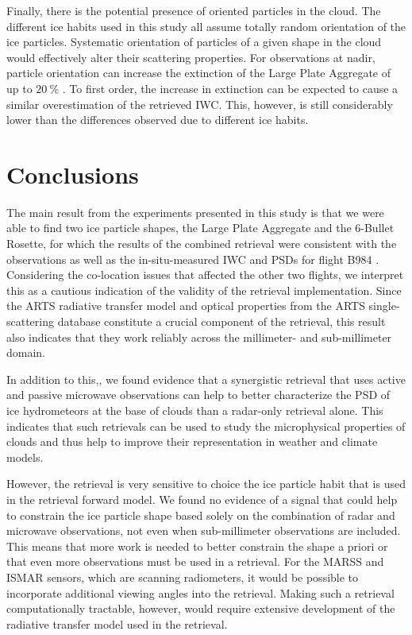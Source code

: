 \documentclass[journal abbreviation, manuscript]{copernicus}
\begin{document}
Finally, there is the potential presence of oriented particles in the cloud. The
different ice habits used in this study all assume totally random orientation of
the ice particles. Systematic orientation of particles of a given shape in the
cloud would effectively alter their scattering properties. For observations at
nadir, particle orientation can increase the extinction of the Large Plate
Aggregate of up to $20\ \unit{\%}$ \citep{barlakas21}. To first order, the
increase in extinction can be expected to cause a similar overestimation of the
retrieved IWC. This, however, is still considerably lower than the differences
observed due to different ice habits.

\section{Conclusions}
\label{sec:conclusions}

The main result from the experiments presented in this study is that we were
able to find two ice particle shapes, the Large Plate Aggregate and the 6-Bullet
Rosette, for which the results of the combined retrieval were consistent with
the observations as well as the in-situ-measured IWC and PSDs for flight B984 .
Considering the co-location issues that affected the other two flights, we
interpret this as a cautious indication of the validity of the retrieval
implementation. Since the ARTS radiative transfer model and optical properties
from the ARTS single-scattering database constitute a crucial component of the
retrieval, this result also indicates that they work reliably across the
millimeter- and sub-millimeter domain.

In addition to this,, we found evidence that a synergistic retrieval that uses
active and passive microwave observations can help to better characterize the
PSD of ice hydrometeors at the base of clouds than a radar-only retrieval alone.
This indicates that such retrievals can be used to study the microphysical
properties of clouds and thus help to improve their representation in weather
and climate models.

However, the retrieval is very sensitive to choice the ice particle habit that
is used in the retrieval forward model. We found no evidence of a signal that
could help to constrain the ice particle shape based solely on the combination
of radar and microwave observations, not even when sub-millimeter observations
are included. This means that more work is needed to better constrain the shape
a priori or that even more observations must be used in a retrieval. For the
MARSS and ISMAR sensors, which are scanning radiometers, it would be possible to
incorporate additional viewing angles into the retrieval. Making such a
retrieval computationally tractable, however, would require extensive
development of the radiative transfer model used in the retrieval.
\end{document}
